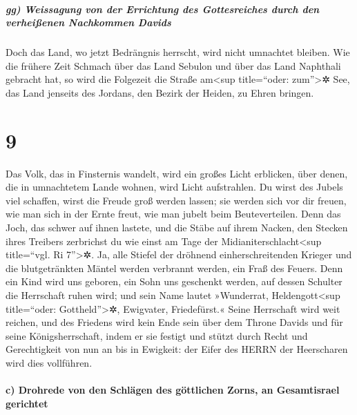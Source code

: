 \hypertarget{gg-weissagung-von-der-errichtung-des-gottesreiches-durch-den-verheiuxdfenen-nachkommen-davids}{%
\subparagraph{gg) Weissagung von der Errichtung des Gottesreiches durch
den verheißenen Nachkommen
Davids}\label{gg-weissagung-von-der-errichtung-des-gottesreiches-durch-den-verheiuxdfenen-nachkommen-davids}}

Doch das Land, wo jetzt Bedrängnis herrscht, wird nicht
umnachtet bleiben. Wie die frühere Zeit Schmach über das Land Sebulon
und über das Land Naphthali gebracht hat, so wird die Folgezeit die
Straße am\textless sup title=``oder: zum''\textgreater✲ See, das Land
jenseits des Jordans, den Bezirk der Heiden, zu Ehren bringen.

\hypertarget{section-8}{%
\section{9}\label{section-8}}

Das Volk, das in Finsternis wandelt, wird ein großes Licht
erblicken, über denen, die in umnachtetem Lande wohnen, wird Licht
aufstrahlen. Du wirst des Jubels viel schaffen, wirst die
Freude groß werden lassen; sie werden sich vor dir freuen, wie man sich
in der Ernte freut, wie man jubelt beim Beuteverteilen.
Denn das Joch, das schwer auf ihnen lastete, und die Stäbe
auf ihrem Nacken, den Stecken ihres Treibers zerbrichst du wie einst am
Tage der Midianiterschlacht\textless sup title=``vgl. Ri
7''\textgreater✲. Ja, alle Stiefel der dröhnend
einherschreitenden Krieger und die blutgetränkten Mäntel werden
verbrannt werden, ein Fraß des Feuers. Denn ein Kind wird
uns geboren, ein Sohn uns geschenkt werden, auf dessen Schulter die
Herrschaft ruhen wird; und sein Name lautet »Wunderrat,
Heldengott\textless sup title=``oder: Gottheld''\textgreater✲,
Ewigvater, Friedefürst.« Seine Herrschaft wird weit
reichen, und des Friedens wird kein Ende sein über dem Throne Davids und
für seine Königsherrschaft, indem er sie festigt und stützt durch Recht
und Gerechtigkeit von nun an bis in Ewigkeit: der Eifer des HERRN der
Heerscharen wird dies vollführen.

\hypertarget{c-drohrede-von-den-schluxe4gen-des-guxf6ttlichen-zorns-an-gesamtisrael-gerichtet}{%
\paragraph{c) Drohrede von den Schlägen des göttlichen Zorns, an
Gesamtisrael
gerichtet}\label{c-drohrede-von-den-schluxe4gen-des-guxf6ttlichen-zorns-an-gesamtisrael-gerichtet}}


